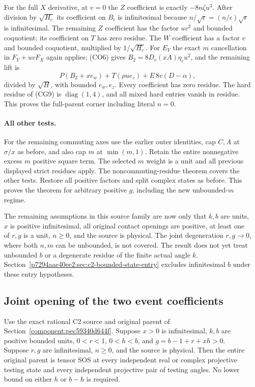 For the full $X$ derivative, at $v=0$ the $Z$ coefficient is exactly
$-8n\zeta u^3$.  After division by $\sqrt{H_c}$ its coefficient
on $B_\epsilon$ is infinitesimal because
$n/\sqrt\epsilon=(n/\epsilon)\sqrt\epsilon$ is infinitesimal.
The remaining $Z$ coefficient has the factor $uv^2$ and bounded
coquotient; its coefficient on $T$ has zero residue.  The $W$
coefficient has a factor $v$ and bounded coquotient, multiplied by
$1/\sqrt{H_c}$.  For $E_Y$ the exact $m$ cancellation in
$F_Y+uvF_X$ again applies; (CO6) gives
$B_2=8D_v(xA)\eta_c u^2$, and the remaining lift is
\[
 P(B_2+xe_w)+T(\rho u e_z)+E\,8v(D-\alpha),
\]
divided by $\sqrt H$, with bounded $e_w,e_z$.
Every coefficient has zero residue.  The hard residue of (CG9) is
$\operatorname{diag}(1,4)$, and all mixed hard entries vanish in
residue.  This proves the full-parent corner including literal $n=0$.

\paragraph{All other tests.}
For the remaining commuting axes use the earlier outer identities,
cap $C,A$ at $\sigma/x$ as before, and also cap $m$ at
$\min(m,1)$.  Retain the entire nonnegative excess $m$ positive square term.
The selected $m$ weight is a unit and all previous displayed
strict residues apply.  The noncommuting-residue theorem covers
the other tests.  Restore all positive factors and split complex
states as before.  This proves the theorem for arbitrary positive
$g$, including the new unbounded-$m$ regime.

The remaining assumptions in this source family are now only that
$k,b$ are units, $x$ is positive infinitesimal, all original contact
openings are positive, at least one of $r,g$ is a unit, $n\geq0$,
and the source is physical.  The joint degeneration $r,g\to0$,
where both $n,m$ can be unbounded, is not covered.  The
result does not yet treat unbounded $b$ or a degenerate residue of
the finite actual angle $k$.  Section~\ref{p7294aae40ee2:sec:c2-bounded-state-entry}
excludes infinitesimal $b$ under these entry hypotheses.

\subsection{Joint opening of the two event coefficients}
\label{component:p8f912583feaa}

\label{p8f912583feaa:sec:c2-joint-centered}

\begin{theorem}
Use the exact rational C2 source and original parent of
Section~\ref{component:pec59340d644f}.  Suppose $x>0$ is infinitesimal,
$k,b$ are positive bounded units, $0<r<1$, $0<h<b$, and
$g=b-1+r+xh>0$.  Suppose $r,g$ are infinitesimal, $n\geq0$, and
the source is physical.  Then the entire original parent is tensor
SOS at every independent real or complex projective testing state
and every independent projective pair of testing angles.  No lower
bound on either $h$ or $b-h$ is required.
\end{theorem}

